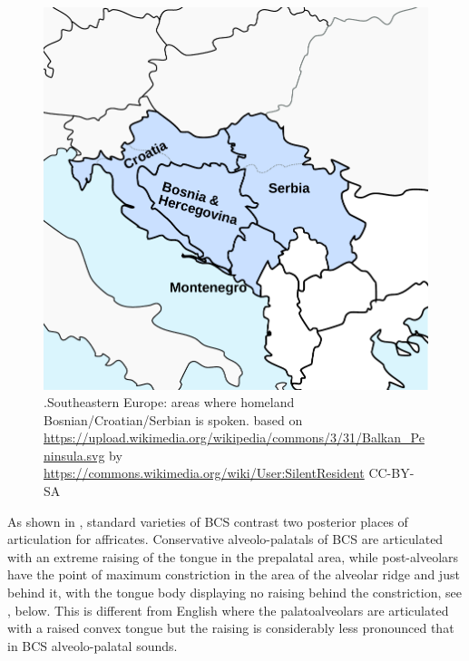 \documentclass[output=paper,modfonts,nonflat,
]{langsci/langscibook}
\begin{document}
\begin{figure}
\includegraphics[height=.3\textheight]{figures/balkans.pdf}
\caption{\label{fig:mihajlovic:1}.Southeastern Europe: areas where homeland Bosnian/Croatian/Serbian is spoken.
\tiny based on \url{https://upload.wikimedia.org/wikipedia/commons/3/31/Balkan_Peninsula.svg} by \url{https://commons.wikimedia.org/wiki/User:SilentResident} CC-BY-SA}
\end{figure}

As shown in , standard varieties of BCS contrast two posterior places of articulation for affricates. Conservative alveolo-palatals of BCS are articulated with an extreme raising of the tongue in the prepalatal area, while post-alveolars have the point of maximum constriction in the area of the alveolar ridge and just behind it, with the tongue body displaying no raising behind the constriction, see , below. This is different from English where the palatoalveolars are articulated with a raised convex tongue but the raising is considerably less pronounced that in BCS alveolo-palatal sounds.
\end{document}
